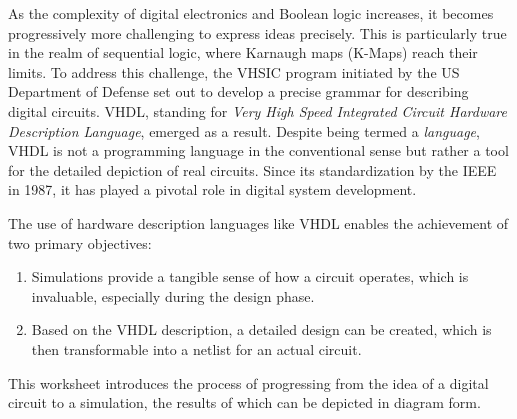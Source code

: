 \documentclass{dcbl/challenge}
\begin{document}
As the complexity of digital electronics and Boolean logic increases, it becomes progressively more challenging to express ideas precisely. 
This is particularly true in the realm of sequential logic, where Karnaugh maps (K-Maps) reach their limits. 
To address this challenge, the VHSIC program initiated by the US Department of Defense set out to develop a precise grammar for describing digital circuits. 
VHDL, standing for \textit{Very High Speed Integrated Circuit Hardware Description Language}, emerged as a result. 
Despite being termed a \textit{language}, VHDL is not a programming language in the conventional sense but rather a tool for the detailed depiction of real circuits.
Since its standardization by the IEEE in 1987, it has played a pivotal role in digital system development.

The use of hardware description languages like VHDL enables the achievement of two primary objectives:

\begin{enumerate}
    \item Simulations provide a tangible sense of how a circuit operates, which is invaluable, especially during the design phase.
    \item Based on the VHDL description, a detailed design can be created, which is then transformable into a netlist for an actual circuit.
\end{enumerate}

This worksheet introduces the process of progressing from the idea of a digital circuit to a simulation, the results of which can be depicted in diagram form.
\end{document}
